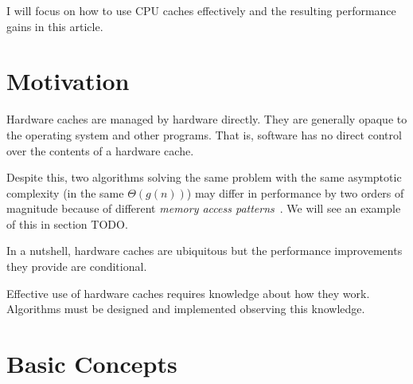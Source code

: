 \documentclass[a4paper]{scrartcl}
\newcommand{\article}{article} %
\begin{document}
I will focus on how to use CPU caches effectively and the resulting
performance gains in this \article{}.

\section{Motivation} %

Hardware caches are managed by hardware directly.  They are generally opaque to the
operating system and other programs.  That is, software has no direct control over the
contents of a hardware cache.


Despite this, two algorithms solving the same problem with the same asymptotic complexity
(in the same \(\Theta(g(n))\)) may differ in performance by two orders of magnitude
because of different \emph{memory access patterns}~\cite{bigos}.  We will see an example
of this in section TODO.

In a nutshell, hardware caches are ubiquitous but the performance improvements they
provide are conditional.
\begin{comment}
   To use them effectively,
   algorithms must be designed and implemented with the architecture
   of hardware caches in mind.
\end{comment}
Effective use of hardware caches requires knowledge about how they work.
Algorithms must be designed and implemented observing this knowledge.


\section{Basic Concepts}
\end{document}
